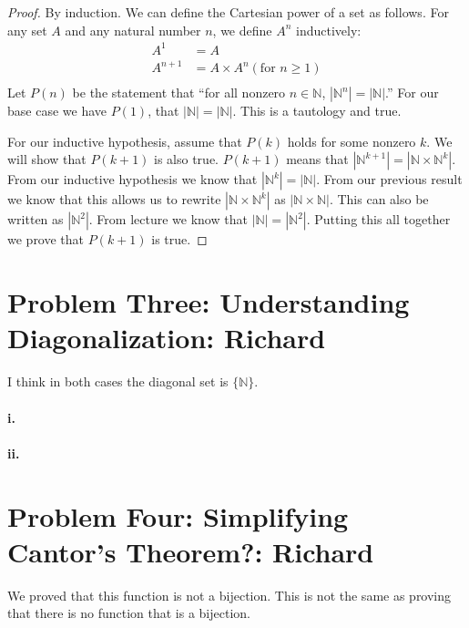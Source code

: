 \documentclass[10pt,letter]{article}
\begin{document}
\begin{proof} By induction. We can define the Cartesian power of a set as follows. For any set $A$ and any natural number $n$, we define $A^n$ inductively:
\begin{align*}
A^1 &= A \\
A^{n+1} &= A \times A^n (\text{for } n \ge 1)\\
\end{align*}
Let $P(n)$ be the statement that ``for all nonzero $n \in \mathbb{N}$, $|\mathbb{N}^n| = |\mathbb{N}|$.'' For our base case we have $P(1)$, that $|\mathbb{N}| = |\mathbb{N}|$. This is a tautology and true.

For our inductive hypothesis, assume that $P(k)$ holds for some nonzero $k$. We will show that $P(k+1)$ is also true. $P(k+1)$ means that $|\mathbb{N}^{k+1}| = |\mathbb{N} \times \mathbb{N}^k|$. From our inductive hypothesis we know that $|\mathbb{N}^k| = |\mathbb{N}|$. From our previous result we know that this allows us to rewrite $|\mathbb{N} \times \mathbb{N}^k|$ as $|\mathbb{N} \times \mathbb{N}|$. This can also be written as $|\mathbb{N}^2|$. From lecture we know that $|\mathbb{N}| = |\mathbb{N}^2|$. Putting this all together we prove that $P(k+1)$ is true.
\end{proof}


\section*{Problem Three: Understanding Diagonalization: Richard}
I think in both cases the diagonal set is $\{\mathbb{N}\}$.

\paragraph{i.} 
\paragraph{ii.}

\section*{Problem Four: Simplifying Cantor's Theorem?: Richard}
We proved that this function is not a bijection. This is not the same as proving that there is no function that is a bijection. 
\end{document}
